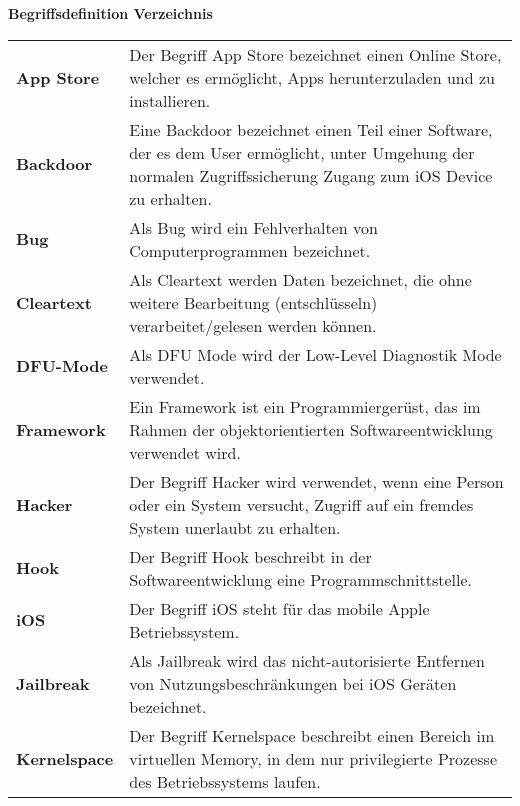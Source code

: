 %
%
% 
% 
% 

\begin{center}
{\Large\bfseries Begriffsdefinition Verzeichnis}
\end{center}

\begin{table*}[htbp]
    \begin{center}
      \begin{tabular}{p{3cm}p{12cm}} 
        
        \textbf{App Store} &  Der Begriff App Store bezeichnet einen Online Store, welcher es ermöglicht, Apps herunterzuladen und zu installieren.\\ 
        
        \textbf{Backdoor} &  Eine Backdoor bezeichnet einen Teil einer Software, der es dem User ermöglicht, unter Umgehung der normalen Zugriffssicherung Zugang zum iOS Device zu erhalten.\\
        \textbf{Bug} &  Als Bug wird ein Fehlverhalten von Computerprogrammen bezeichnet.\\ 
		
		\textbf{Cleartext} &  Als Cleartext werden Daten bezeichnet, die ohne weitere Bearbeitung (entschlüsseln) verarbeitet/gelesen werden können.\\     
		\textbf{DFU-Mode} & Als DFU Mode wird der Low-Level Diagnostik Mode verwendet.\\
		\textbf{Framework} & Ein Framework ist ein Programmiergerüst, das im Rahmen der objektorientierten Softwareentwicklung verwendet wird. \\
		
		\textbf{Hacker} &  Der Begriff Hacker wird verwendet, wenn eine Person oder ein System versucht, Zugriff auf ein fremdes System unerlaubt zu erhalten.\\
		\textbf{Hook} & Der Begriff Hook beschreibt in der Softwareentwicklung eine Programmschnittstelle.\\
		  
		\textbf{iOS} &  Der Begriff iOS steht für das mobile Apple Betriebssystem.\\
		  
		 \textbf{Jailbreak} &  Als Jailbreak wird das nicht-autorisierte Entfernen von Nutzungsbeschränkungen bei iOS Geräten bezeichnet.\\  
		 \textbf{Kernelspace} & Der Begriff Kernelspace beschreibt einen Bereich im virtuellen Memory, in dem nur privilegierte Prozesse des Betriebssystems laufen.\\ 
		      

\end{tabular}
\end{center}
\end{table*}
